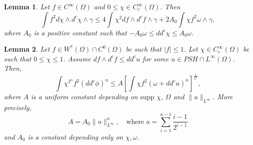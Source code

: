 \documentclass[10pt,a4paper]{amsart}
\newtheorem{lem}{Lemma}
\newcommand{\Om}{\Omega}
\newcommand{\ga}{\gamma}
\newcommand{\om}{\omega}
\newcommand{\supp}{\mbox{supp }}
\newcommand{\wed}{\wedge}
\begin{document}
\begin{lem}\label{lem:extra-grad} Let $f\in C^\infty(\Om)$ and $0\leq \chi \in C^\infty_c(\Om)$. Then
$$
	\int f^2 d\chi \wed d^c \chi \wed \ga \leq 4 \int \chi^2 df \wed d^c f \wed \ga +  2A_0\int \chi f^2 \om\wed\ga, 
$$
where $A_0$ is a positive constant such that $-A_0 \om \leq dd^c\chi \leq A_0\om$.
\end{lem}

\begin{lem} \label{lem:wed-prod} Let $f\in W^*(\Om) \cap C^0(\Om)$ be such that $|f| \leq 1$. Let $\chi\in C^\infty_c(\Om)$ be such that  $0\leq \chi \leq 1$. Assume $df \wed d^c f \leq dd^c u$ for some $u \in PSH\cap L^\infty(\Om)$. Then,
$$
	\int \chi^{2^n} f^2 (dd^c\phi)^n \leq  A \left[ \int \chi f^2 (\om + dd^c u)^n \right]^\frac{1}{2^n},
$$
where $A$ is a uniform constant depending on $\supp \chi$, $\Om$ and $\|u\|_{L^\infty}$. More precisely, 
$$ 
	A = A_0 \|u\|_{L^\infty}^{a}, \quad \text{where }  
	a = \sum_{i=1}^{n-1} \frac{i-1}{2^{i-1}}
$$
and $A_0$ is a constant depending only on $\chi, \om$.
\end{lem}
\end{document}
